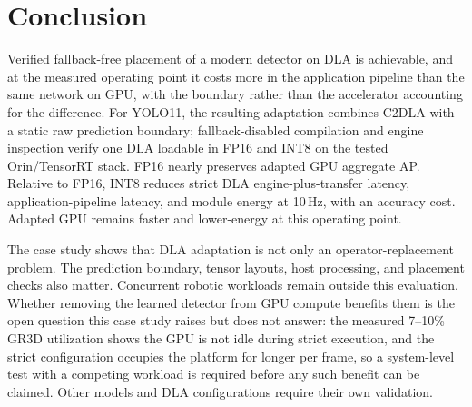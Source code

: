 \section{Conclusion}
Verified fallback-free placement of a modern detector on DLA is achievable, and
at the measured operating point it costs more in the application pipeline than
the same network on GPU, with the boundary rather than the accelerator
accounting for the difference.
For YOLO11, the resulting adaptation combines C2DLA with a static raw prediction boundary;
fallback-disabled compilation and engine inspection verify one DLA loadable
in FP16 and INT8 on the tested Orin/TensorRT stack. FP16 nearly preserves
adapted GPU aggregate AP. Relative to FP16, INT8 reduces strict DLA engine-plus-transfer latency,
application-pipeline latency, and module energy at 10\,Hz, with an accuracy cost.
Adapted GPU remains faster and lower-energy at this operating point.

The case study shows that DLA adaptation is not only an operator-replacement
problem. The prediction boundary, tensor layouts, host processing, and placement
checks also matter. Concurrent robotic workloads remain outside this evaluation. Whether removing
the learned detector from GPU compute benefits them is the open question this
case study raises but does not answer: the measured 7--10\% GR3D utilization
shows the GPU is not idle during strict execution, and the strict configuration
occupies the platform for longer per frame, so a system-level test with a
competing workload is required before any such benefit can be claimed.
Other models and DLA configurations require their own validation.

